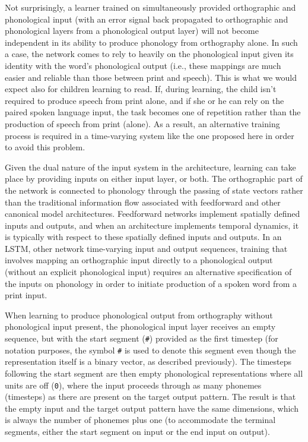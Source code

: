 \documentclass[
  american,
  ,man,floatsintext]{apa6}
\begin{document}
Not surprisingly, a learner trained on simultaneously provided orthographic and phonological input (with an error signal back propagated to orthographic and phonological layers from a phonological output layer) will not become independent in its ability to produce phonology from orthography alone. In such a case, the network comes to rely to heavily on the phonological input given its identity with the word's phonological output (i.e., these mappings are much easier and reliable than those between print and speech). This is what we would expect also for children learning to read. If, during learning, the child isn't required to produce speech from print alone, and if she or he can rely on the paired spoken language input, the task becomes one of repetition rather than the production of speech from print (alone). As a result, an alternative training process is required in a time-varying system like the one proposed here in order to avoid this problem.

Given the dual nature of the input system in the architecture, learning can take place by providing inputs on either input layer, or both. The orthographic part of the network is connected to phonology through the passing of state vectors rather than the traditional information flow associated with feedforward and other canonical model architectures. Feedforward networks implement spatially defined inputs and outputs, and when an architecture implements temporal dynamics, it is typically with respect to these spatially defined inputs and outputs. In an LSTM, other network time-varying input and output sequences, training that involves mapping an orthographic input directly to a phonological output (without an explicit phonological input) requires an alternative specification of the inputs on phonology in order to initiate production of a spoken word from a print input.

When learning to produce phonological output from orthography without phonological input present, the phonological input layer receives an empty sequence, but with the start segment (\texttt{\#}) provided as the first timestep (for notation purposes, the symbol \texttt{\#} is used to denote this segment even though the representation itself is a binary vector, as described previously). The timesteps following the start segment are then empty phonological representations where all units are off (\texttt{0}), where the input proceeds through as many phonemes (timesteps) as there are present on the target output pattern. The result is that the empty input and the target output pattern have the same dimensions, which is always the number of phonemes plus one (to accommodate the terminal segments, either the start segment on input or the end input on output).
\end{document}

